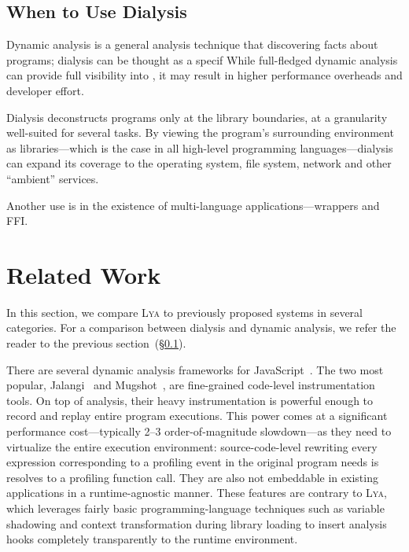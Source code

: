 \documentclass[letterpaper,twocolumn,10pt]{article}
\newcommand{\heading}[1]{\vspace{2pt}\noindent\textbf{#1}\enspace}
\newcommand{\sx}[1]{(\S\ref{#1})}
\newcommand{\sys}{{\scshape Lya}\xspace}
\begin{document}
\subsection{When to Use Dialysis}
\label{principles}
Dynamic analysis is a general analysis technique that discovering facts about programs;
  dialysis can be thought as a specif
While full-fledged dynamic analysis can provide full visibility into , it may result in higher performance overheads and developer effort.

Dialysis deconstructs programs only at the library boundaries, at a granularity well-suited for several tasks.
By viewing the program's surrounding environment as libraries---which is the case in all high-level programming languages---dialysis can expand its coverage to the operating system, file system, network and other ``ambient'' services.

Another use is in the existence of multi-language applications---wrappers and FFI.


\section{Related Work}
\label{rw}

In this section, we compare \sys to previously proposed systems in several categories.
For a comparison between dialysis and dynamic analysis, we refer the reader to the previous section~\sx{principles}.

There are several dynamic analysis frameworks for JavaScript~\cite{javascript1, javascript2, javascript3, mugshot, jalangi}.
The two most popular, Jalangi~\cite{jalangi} and Mugshot~\cite{mugshot}, are fine-grained code-level instrumentation tools.
On top of analysis, their heavy instrumentation is powerful enough to record and replay entire program executions.
This power comes at a significant performance cost---typically 2--3 order-of-magnitude slowdown---as they need to virtualize the entire execution environment:
  source-code-level rewriting every expression corresponding to a profiling event in the original program needs is resolves to a profiling function call.
They are also not embeddable in existing applications in a runtime-agnostic manner.
These features are contrary to \sys, which leverages fairly basic programming-language techniques such as variable shadowing and context transformation during library loading to insert analysis hooks completely transparently to the runtime environment.
\end{document}
